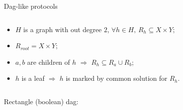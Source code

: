 \begin{frame}{Dag-like protocols}
    \vspace{-0.8cm}
    \begin{columns}[t]
        \begin{column}{0.58\textwidth}
            \begin{itemize}
                \item $H$ is a graph with out degree $2$, $\forall h \in H, ~ R_h \subseteq X \times Y$;
                \item $R_{root} = X \times Y$;
                \item $a, b$ are children of $h$ $\Rightarrow$ $R_{h} \subseteq R_{a} \cup R_{b}$;
                \item $h$ is a leaf $\Rightarrow$ $h$ is marked by common solution for $R_h$.
            \end{itemize}
        \end{column}

		\begin{column}{0.38\textwidth}
            \begin{center}
                
            \end{center}
		\end{column}
	\end{columns}

    \pause
    \begin{center}
        Rectangle (boolean) dag:
        
        \vspace{0.2cm}
        
    \end{center}

\end{frame}

